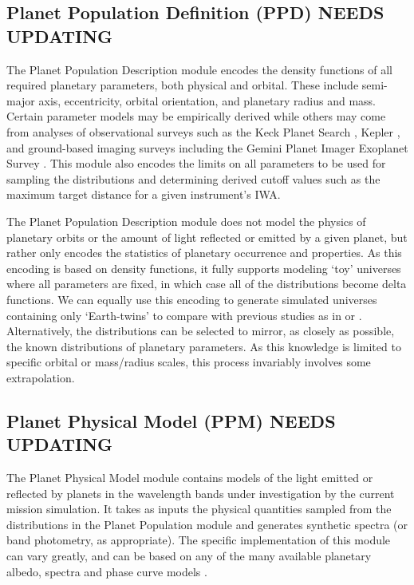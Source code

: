 \documentclass[]{asme2ej}
\begin{document}

\subsection{Planet Population Definition (PPD) NEEDS UPDATING}
The Planet Population Description module encodes the density functions of all required planetary parameters, both physical and orbital. These include semi-major axis, eccentricity, orbital orientation, and planetary radius and mass. Certain parameter models may be empirically derived \citep{Savransky2011} while others may come from analyses \citep{Dressing2013,Fortney2007} of observational surveys such as the Keck Planet Search \citep{Cumming2008,Howard2010}, Kepler \citep{Batalha2013,Fressin2013,Petigura2013}, and ground-based imaging surveys including the Gemini Planet Imager Exoplanet Survey \citep{McBride2011,Macintosh2014}.  This module also encodes the limits on all parameters to be used for sampling the distributions and determining derived cutoff values such as the maximum target distance for a given instrument's IWA.

The Planet Population Description module does not model the physics of planetary orbits or the amount of light reflected or emitted by a given planet, but rather only encodes the statistics of planetary occurrence and properties.  As this encoding is based on density functions, it fully supports modeling `toy' universes where all parameters are fixed, in which case all of the distributions become delta functions.  We can equally use this encoding to generate simulated universes containing only `Earth-twins' to compare with previous studies as in \citet{brown2005} or \citet{Stark2014}.  Alternatively, the distributions can be selected to mirror, as closely as possible, the known distributions of planetary parameters.  As this knowledge is limited to specific orbital or mass/radius scales, this process invariably involves some extrapolation.


\subsection{Planet Physical Model (PPM) NEEDS UPDATING}
The Planet Physical Model module contains models of the light emitted or reflected by planets in the wavelength bands under investigation by the current mission simulation.  It takes as inputs the physical quantities sampled from the distributions in the Planet Population module and generates synthetic spectra (or band photometry, as appropriate).  The specific implementation of this module can vary greatly, and can be based on any of the many available planetary albedo, spectra and phase curve models \citep{Pollack1986,Marley1999,Fortney2008,Cahoy2010,Spiegel2012,burrows1997nongray,burrows2003beyond}.
\end{document}
